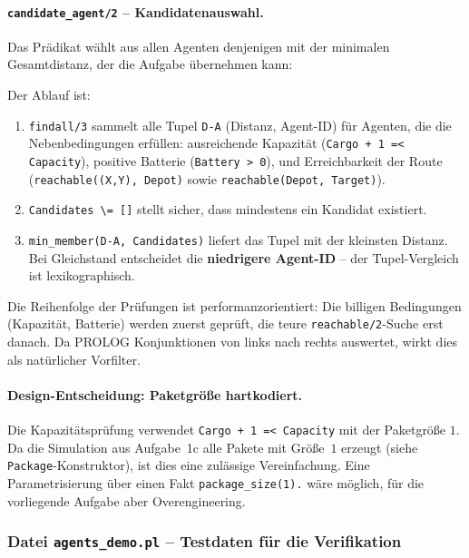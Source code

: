 \paragraph{\texttt{candidate\_agent/2} – Kandidatenauswahl.}
Das Prädikat wählt aus allen Agenten denjenigen mit der minimalen Gesamtdistanz, der die Aufgabe übernehmen kann:



Der Ablauf ist:
\begin{enumerate}
    \item \texttt{findall/3} sammelt alle Tupel \texttt{D-A} (Distanz, Agent-ID) für Agenten, die die Nebenbedingungen erfüllen: ausreichende Kapazität (\texttt{Cargo + 1 =< Capacity}), positive Batterie (\texttt{Battery > 0}), und Erreichbarkeit der Route (\texttt{reachable((X,Y), Depot)} sowie \texttt{reachable(Depot, Target)}).
    \item \texttt{Candidates \textbackslash= []} stellt sicher, dass mindestens ein Kandidat existiert.
    \item \texttt{min\_member(D-A, Candidates)} liefert das Tupel mit der kleinsten Distanz. Bei Gleichstand entscheidet die \textbf{niedrigere Agent-ID} -- der Tupel-Vergleich ist lexikographisch.
\end{enumerate}

Die Reihenfolge der Prüfungen ist performanzorientiert: Die billigen Bedingungen (Kapazität, Batterie) werden zuerst geprüft, die teure \texttt{reachable/2}-Suche erst danach. Da \acs{PROLOG} Konjunktionen von links nach rechts auswertet, wirkt dies als natürlicher Vorfilter.

\paragraph{Design-Entscheidung: Paketgröße hartkodiert.}
Die Kapazitätsprüfung verwendet \texttt{Cargo + 1 =< Capacity} mit der Paketgröße $1$. Da die Simulation aus Aufgabe~1c alle Pakete mit Größe~$1$ erzeugt (siehe \texttt{Package}-Konstruktor), ist dies eine zulässige Vereinfachung. Eine Parametrisierung über einen Fakt \texttt{package\_size(1).} wäre möglich, für die vorliegende Aufgabe aber Overengineering.


\subsubsection{Datei \texttt{agents\_demo.pl} – Testdaten für die Verifikation}

